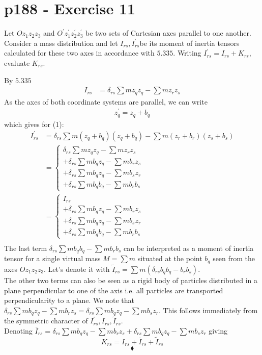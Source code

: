 \section{p188 - Exercise 11}
\begin{tcolorbox}
Let $Oz_1z_2z_3$ and $O^{'}z^{'}_1z^{'}_2z^{'}_3$ be two sets of Cartesian axes parallel to one another. Consider a mass distribution and let $I_{rs}, I^{'}_{rs}$be its moment of inertia tensors calculated for these two axes in accordance with $\mathbf{5.335}$. Writing $ I^{'}_{rs}=I_{rs}+K_{rs}$, evaluate $K_{rs}$.
\end{tcolorbox}
By  $\mathbf{5.335}$
\begin{align}
I_{rs}&= \delta_{rs}\sum m z_qz_q - \sum m z_r z_s
\end{align}
As the axes of both coordinate systems are parallel, we can write
\begin{align}
z^{'}_q = z_q + b_q
\end{align}
which gives for (1):
\begin{align}
I_{rs}^{'}&= \delta_{rs}\sum m \left(z_q + b_q\right)\left(z_q + b_q\right) - \sum m \left(z_r + b_r\right) \left(z_s + b_s\right)\\
&=\left\{\begin{array}{l}\delta_{rs}\sum m z_q z_q  - \sum m z_r z_s\\ +\delta_{rs}\sum m b_qz_q - \sum m  b_rz_s \\+\delta_{rs}\sum m b_qz_q - \sum m  b_sz_r \\+\delta_{rs}\sum m  b_qb_q- \sum mb_rb_s\end{array}\right.\\
&=\left\{\begin{array}{l}I_{rs}\\ +\delta_{rs}\sum m b_qz_q - \sum m  b_rz_s \\+\delta_{rs}\sum m b_qz_q - \sum m  b_sz_r \\+\delta_{rs}\sum m  b_qb_q- \sum mb_rb_s\end{array}\right.\\
\end{align}
The last term $\delta_{rs}\sum m  b_qb_q- \sum mb_rb_s$ can be interpreted as a  moment of inertia tensor for a single  virtual mass $M=\sum m$ situated at the point $b_q$ seen from the axes $Oz_1z_2z_3$. Let's denote it with $\tilde{I}_{rs}= \sum m \left(\delta_{rs} b_qb_q- b_rb_s\right)$.\\
The other two terms can also be seen as a rigid body of particles distributed in a plane perpendicular to one of the axis i.e. all particles are transported perpendicularity to a plane. We note that $\delta_{rs}\sum m b_qz_q - \sum m  b_rz_s = \delta_{rs}\sum m b_qz_q - \sum m  b_sz_r$. This follows immediately from the symmetric character of $I_{rs}^{'},I_{rs}^{},\tilde{I}_{rs}$. \\ Denoting $\overline{I}_{rs}= \delta_{rs}\sum m b_qz_q - \sum m  b_rz_s +\delta_{rs}\sum m b_qz_q - \sum m  b_sz_r$ giving
$$ K_{rs} = I_{rs}+\overline{I}_{rs}+\tilde{I}_{rs}$$
$$\blacklozenge$$


